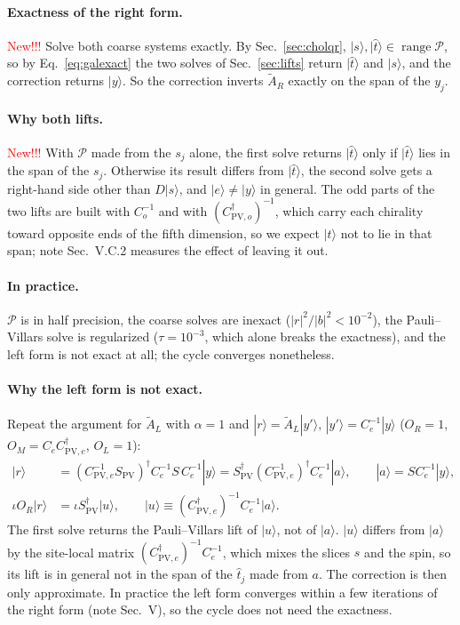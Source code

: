 \documentclass[11pt,a4paper]{article}
\numberwithin{equation}{section}
\newcommand{\dg}{^{\dagger}}
\newcommand{\Spv}{S_{\mathrm{PV}}}
\newcommand{\AR}{\tilde A_{R}}
\newcommand{\AL}{\tilde A_{L}}
\newcommand{\Pro}{\mathcal P}
\newcommand{\Ce}{C_{e}}
\newcommand{\Co}{C_{o}}
\newcommand{\Cpve}{C_{\mathrm{PV},e}}
\newcommand{\Cpvo}{C_{\mathrm{PV},o}}
\begin{document}
\paragraph{Exactness of the right form.} \textcolor{red}{New!!!} Solve both coarse systems exactly. By
Sec.~\ref{sec:cholqr}, $|s\rangle,|\hat t\rangle\in\operatorname{range}\Pro$, so by
Eq.~\eqref{eq:galexact} the two solves of Sec.~\ref{sec:lifts} return $|\hat t\rangle$ and
$|s\rangle$, and the correction returns $|y\rangle$. So the correction inverts $\AR$ exactly on
the span of the $y_j$.

\paragraph{Why both lifts.} \textcolor{red}{New!!!} With $\Pro$ made from the $s_j$ alone, the first solve
returns $|\hat t\rangle$ only if $|\hat t\rangle$ lies in the span of the $s_j$. Otherwise its
result differs from $|\hat t\rangle$, the second solve gets a right-hand side other than
$D|s\rangle$, and $|e\rangle\neq|y\rangle$ in general. The odd parts of the two lifts are built
with $\Co^{-1}$ and with $(\Cpvo\dg)^{-1}$, which carry each chirality toward opposite ends of
the fifth dimension, so we expect $|\hat t\rangle$ not to lie in that span; note Sec.~V.C.2
measures the effect of leaving it out.

\paragraph{In practice.} $\Pro$ is in half precision, the coarse solves are inexact
($|r|^2/|b|^2<10^{-2}$), the Pauli--Villars solve is regularized ($\tau=10^{-3}$, which alone
breaks the exactness), and the left form is not exact at all; the cycle converges nonetheless.

\paragraph{Why the left form is not exact.} Repeat the argument for $\AL$ with $\alpha=1$ and
$|r\rangle=\AL|y'\rangle$, $|y'\rangle=\Ce^{-1}|y\rangle$ ($O_R=1$, $O_M=\Ce\Cpve\dg$, $O_L=1$):
\begin{align}
|r\rangle&=(\Cpve^{-1}\Spv)\dg\Ce^{-1}S\,\Ce^{-1}|y\rangle=\Spv\dg(\Cpve^{-1})\dg\Ce^{-1}|a\rangle,\qquad |a\rangle=S\Ce^{-1}|y\rangle,\nonumber\\
\iota O_R|r\rangle&=\iota\Spv\dg|u\rangle,\qquad |u\rangle\equiv(\Cpve\dg)^{-1}\Ce^{-1}|a\rangle .
\end{align}
The first solve returns the Pauli--Villars lift of $|u\rangle$, not of $|a\rangle$. $|u\rangle$ differs from $|a\rangle$ by the
site-local matrix $(\Cpve\dg)^{-1}\Ce^{-1}$, which mixes the slices $s$ and the spin, so its lift
is in general not in the span of the $\hat t_j$ made from $a$. The correction is then only
approximate. In practice the left form converges within a few iterations of the right form (note
Sec.~V), so the cycle does not need the exactness.
\end{document}
